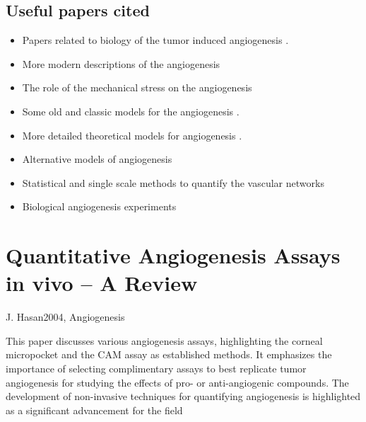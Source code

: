 \subsection{Useful papers cited}
\begin{itemize}
	\item Papers related to biology of the tumor induced angiogenesis \cite{Gupta2003,Folkman1971}.
	\item More modern descriptions of the angiogenesis \cite{Lugano2020,Saman2020}
	\item The role of the mechanical stress on the angiogenesis \cite{Li2005,Li2002,Vavourakis2017}
	\item Some old and classic models for the angiogenesis \cite{Anderson1998,Balding1985,Byrne1995,Stokes1991}.
	\item More detailed theoretical models for angiogenesis \cite{Byrne2010,Hadjicharalambous2021,Metzcar2019,Scianna2013}.
	\item Alternative models of angiogenesis \cite{Vilanova2017,Stepanova2021,Perfahl2017,Grogan2017,Vavourakis2017,Cai2017,Sefidgar2015}
	\item Statistical and single scale methods to quantify the vascular networks \cite{Perfahl2017,Folarin2010,Kannan2018,Konerding1999,Konerding2001}
	\item Biological angiogenesis experiments \cite{Bauer2007}
\end{itemize}


\section{Quantitative Angiogenesis Assays in vivo – A Review}{J. Hasan}{2004, Angiogenesis}

This paper discusses various angiogenesis assays, highlighting the corneal micropocket and the CAM assay as established methods. It emphasizes the importance of selecting complimentary assays to best replicate tumor angiogenesis for studying the effects of pro- or anti-angiogenic compounds. The development of non-invasive techniques for quantifying angiogenesis is highlighted as a significant advancement for the field \cite{Hasan2004} 


